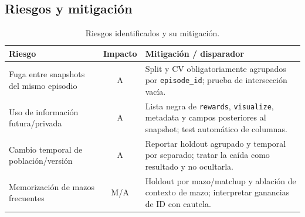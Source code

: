 \subsection{Riesgos y mitigación}
\label{subsec:riesgos}
\begin{table}[!t]
\centering
\caption{Riesgos identificados y su mitigación.}
\label{tab:riesgos}
\footnotesize
\begin{tabularx}{\columnwidth}{@{}P{2.0cm} c Y@{}}
\toprule
\textbf{Riesgo} & \textbf{Impacto} & \textbf{Mitigación / disparador}\\
\midrule
Fuga entre snapshots del mismo episodio & A & Split y CV obligatoriamente agrupados por \texttt{episode\_id}; prueba de intersección vacía.\\
Uso de información futura/privada & A & Lista negra de \texttt{rewards}, \texttt{visualize}, metadata y campos posteriores al snapshot; test automático de columnas.\\
Cambio temporal de población/versión & A & Reportar holdout agrupado y temporal por separado; tratar la caída como resultado y no ocultarla.\\
Memorización de mazos frecuentes & M/A & Holdout por mazo/matchup y ablación de contexto de mazo; interpretar ganancias de ID con cautela.\\
\bottomrule
\end{tabularx}
\end{table}
